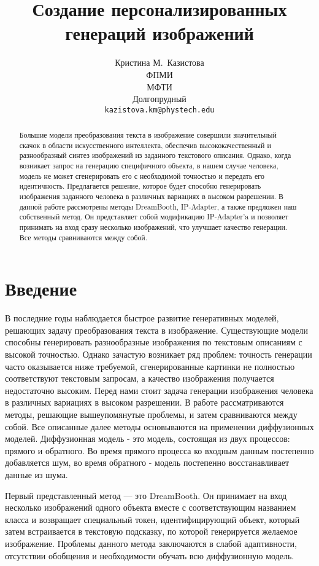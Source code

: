 \documentclass{article}
\title{Создание персонализированных генераций изображений}
\author{ Кристина М.~Казистова \\
	ФПМИ\\
	МФТИ\\
	Долгопрудный \\
	\texttt{kazistova.km@phystech.edu} \\
}
\date{}
\begin{document}
\maketitle

\begin{abstract}
Большие модели преобразования текста в изображение совершили значительный скачок в области искусственного интеллекта, обеспечив высококачественный и разнообразный синтез изображений из заданного текстового описания. Однако, когда возникает запрос на генерацию специфичного объекта, в нашем случае человека, модель не может сгенерировать его с необходимой точностью и передать его идентичность. Предлагается решение, которое будет способно генерировать изображения заданного человека в различных вариациях в высоком разрешении. В данной работе рассмотрены методы DreamBooth, IP-Adapter, а также предложен наш собственный метод. Он представляет собой модификацию IP-Adapter'a и позволяет принимать на вход сразу несколько изображений, что улучшает качество генерации. Все методы сравниваются между собой. 
\end{abstract}

\section{Введение}
В последние годы наблюдается быстрое развитие генеративных моделей, решающих задачу преобразования текста в изображение. Существующие модели способны генерировать разнообразные изображения по текстовым описаниям с высокой точностью. Однако зачастую возникает ряд проблем: точность генерации часто оказывается ниже требуемой, сгенерированные картинки не полностью соответствуют текстовым запросам, а качество изображения получается недостаточно высоким. 
Перед нами стоит задача генерации изображения человека в различных вариациях в высоком разрешении. В работе рассматриваются методы, решающие вышеупомянутые проблемы, и затем сравниваются между собой. Все описанные далее методы основываются на применении диффузионных моделей. Диффузионная модель - это модель, состоящая из двух процессов: прямого и обратного. Во время прямого процесса ко входным данным постепенно добавляется шум, во время обратного - модель постепенно восстанавливает данные из шума. 

Первый представленный метод --- это DreamBooth. Он принимает на вход несколько изображений одного объекта вместе с соответствующим названием класса и возвращает специальный токен, идентифицирующий объект, который затем встраивается в текстовую подсказку, по которой генерируется желаемое изображение. Проблемы данного метода заключаются в слабой адаптивности, отсутствии обобщения и необходимости обучать всю диффузионную модель. 
\end{document}
